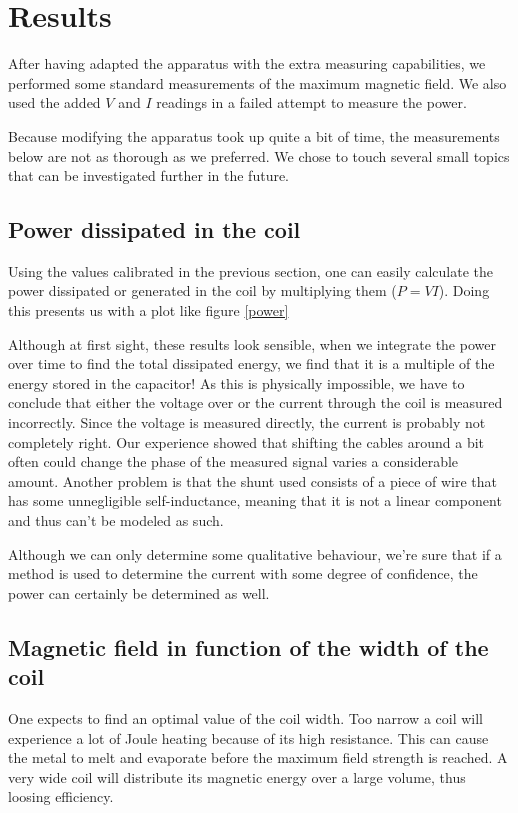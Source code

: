 \section{Results}
After having adapted the apparatus with the extra measuring capabilities, 
we performed some standard measurements of the maximum magnetic field. We also 
used the added $V$ and $I$ readings in a failed attempt to measure the power.

Because modifying the apparatus took up quite a bit of time, the 
measurements below are not as thorough as we preferred. We chose to touch 
several small topics that can be investigated further in the future.

\subsection{Power dissipated in the coil}

Using the values calibrated in the previous section, one can easily calculate 
the power dissipated or generated in the coil by multiplying them ($P = VI$).  
Doing this presents us with a plot like figure \ref{power}

Although at first sight, these results look sensible, when we integrate the 
power over time to find the total dissipated energy, we find that it is a 
multiple of the energy stored in the capacitor! As this is physically 
impossible, we have to conclude that either the voltage over or the current 
through the coil is measured incorrectly. Since the voltage is measured 
directly, the current is probably not completely right. Our experience showed 
that shifting the cables around a bit often could change the phase of the 
measured signal varies a considerable amount. Another problem is that the shunt 
used consists of a piece of wire that has some unnegligible self-inductance, 
meaning that it is not a linear component and thus can't be modeled as such.

Although we can only determine some qualitative behaviour, we're sure that if a 
method is used to determine the current with some degree of confidence, the 
power can certainly be determined as well.


\subsection{Magnetic field in function of the width of the coil}
One expects to find an optimal value of the coil width. Too narrow a coil 
will experience a lot of Joule heating because of its high resistance. This 
can cause the metal to melt and evaporate before the maximum field strength 
is reached. A very wide coil will distribute its magnetic energy over a 
large volume, thus loosing efficiency.

